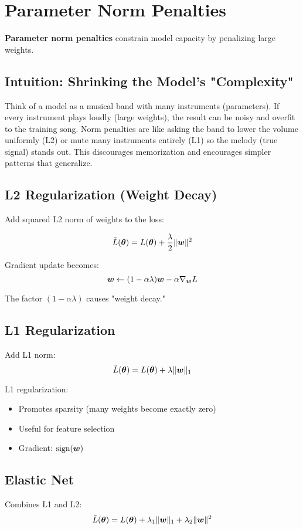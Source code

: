 
\section{Parameter Norm Penalties }
\label{sec:parameter-penalties}

\textbf{Parameter norm penalties} constrain model capacity by penalizing large weights.

\subsection{Intuition: Shrinking the Model's "Complexity"}

Think of a model as a musical band with many instruments (parameters). If every instrument plays loudly (large weights), the result can be noisy and overfit to the training song. Norm penalties are like asking the band to lower the volume uniformly (L2) or mute many instruments entirely (L1) so the melody (true signal) stands out. This discourages memorization and encourages simpler patterns that generalize.

\subsection{L2 Regularization (Weight Decay)}

Add squared L2 norm of weights to the loss:

\begin{equation}
\tilde{L}(\boldsymbol{\theta}) = L(\boldsymbol{\theta}) + \frac{\lambda}{2} \|\boldsymbol{w}\|^2
\end{equation}

Gradient update becomes:
\begin{equation}
\boldsymbol{w} \leftarrow (1 - \alpha\lambda)\boldsymbol{w} - \alpha \nabla_{\boldsymbol{w}} L
\end{equation}

The factor $(1 - \alpha\lambda)$ causes "weight decay."

\subsection{L1 Regularization}

Add L1 norm:
\begin{equation}
\tilde{L}(\boldsymbol{\theta}) = L(\boldsymbol{\theta}) + \lambda \|\boldsymbol{w}\|_1
\end{equation}

L1 regularization:
\begin{itemize}
    \item Promotes sparsity (many weights become exactly zero)
    \item Useful for feature selection
    \item Gradient: $\text{sign}(\boldsymbol{w})$
\end{itemize}


\subsection{Elastic Net}

Combines L1 and L2:
\begin{equation}
\tilde{L}(\boldsymbol{\theta}) = L(\boldsymbol{\theta}) + \lambda_1 \|\boldsymbol{w}\|_1 + \lambda_2 \|\boldsymbol{w}\|^2
\end{equation}

